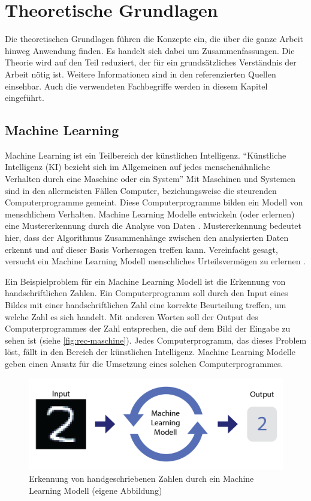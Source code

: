 \chapter{Theoretische Grundlagen}\label{chap:t}
Die theoretischen Grundlagen führen die Konzepte ein, die über die ganze Arbeit
hinweg Anwendung finden. Es handelt sich dabei um Zusammenfassungen. Die Theorie
wird auf den Teil reduziert, der für ein grundsätzliches Verständnis der Arbeit
nötig ist. Weitere Informationen sind in den referenzierten Quellen
einsehbar. Auch die verwendeten Fachbegriffe werden in diesem Kapitel
eingeführt. 

\section{Machine Learning}\label{chap:t_ml}
Machine Learning ist ein Teilbereich
der künstlichen Intelligenz. ``Künstliche Intelligenz (KI) bezieht sich im
Allgemeinen auf jedes menschenähnliche Verhalten durch eine Maschine oder ein
System'' \cite{noauthor_what_nodate} Mit Maschinen und Systemen sind in den
allermeisten Fällen Computer, beziehungsweise die steurenden Computerprogramme
gemeint. Diese Computerprogramme bilden ein Modell von menschlichem Verhalten.
Machine Learning Modelle entwickeln (oder erlernen) eine Mustererkennung durch
die Analyse von Daten \cite{noauthor_what_nodate-1}. Mustererkennung bedeutet hier,
dass der Algorithmus Zusammenhänge zwischen den analysierten Daten erkennt und
auf dieser Basis Vorhersagen treffen kann. Vereinfacht gesagt, versucht ein
Machine Learning Modell menschliches Urteilsvermögen zu erlernen \cite{spaulding_is_2020}.

Ein Beispielproblem für ein Machine Learning Modell ist die Erkennung von
handschriftlichen Zahlen. Ein Computerprogramm soll durch den Input eines Bildes
mit einer handschriftlichen Zahl eine korrekte Beurteilung treffen, um welche
Zahl es sich handelt. Mit anderen Worten soll der Output des Computerprogrammes
der Zahl entsprechen, die auf dem Bild der Eingabe zu sehen ist (siehe \autoref{fig:rec-maschine}). Jedes
Computerprogramm, das dieses Problem löst, fällt in den Bereich der künstlichen
Intelligenz. Machine Learning Modelle geben einen Ansatz für die Umsetzung eines
solchen Computerprogrammes.

\begin{figure}[!ht]
    \centering
    \includegraphics[width=\textwidth]{images/theorie/rec-maschine.png}
    \caption{Erkennung von handgeschriebenen Zahlen durch ein Machine Learning Modell (eigene Abbildung)}
    \label{fig:rec-maschine}
\end{figure}

